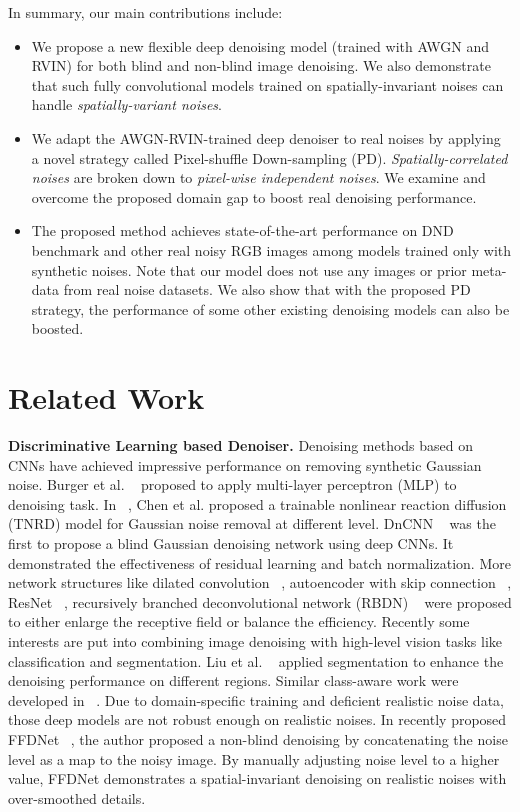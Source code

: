 \documentclass[letterpaper]{article} \usepackage{aaai20}  \usepackage{times}  \usepackage{helvet} \usepackage{courier}  \usepackage{comment}
\begin{document}
In summary, our main contributions include:
\begin{itemize}

\item
We propose a new flexible deep denoising model (trained with AWGN and RVIN) for both blind and non-blind image denoising. We also demonstrate that such fully convolutional models trained on spatially-invariant noises can handle {\em spatially-variant noises}. 
\item
We adapt the AWGN-RVIN-trained deep denoiser to real noises by applying a novel strategy called Pixel-shuffle Down-sampling (PD). {\em Spatially-correlated noises} are broken down to {\em pixel-wise independent noises}. We examine and overcome the proposed domain gap to boost real denoising performance.
\item
The proposed method achieves state-of-the-art performance on DND benchmark and other real noisy RGB images among models trained only with synthetic noises. Note that our model does not use any images or prior meta-data from real noise datasets. We also show that with the proposed PD strategy, the performance of some other existing denoising models can also be boosted. 
\end{itemize}
 \section{Related Work}
\textbf{Discriminative Learning based Denoiser.}
Denoising methods based on CNNs have achieved impressive performance on removing synthetic Gaussian noise.  Burger et al. ~\cite{burger2012image} proposed to apply multi-layer perceptron (MLP) to denoising task. In ~\cite{chen2017trainable}, Chen et al. proposed  a trainable nonlinear reaction diffusion (TNRD) model for Gaussian noise removal at different level. DnCNN ~\cite{zhang2017beyond} was the first to propose a blind Gaussian denoising network using deep CNNs. It demonstrated the effectiveness of residual learning and batch normalization. More network structures like dilated convolution ~\cite{zhang2017learning}, autoencoder with skip connection ~\cite{mao2016image}, ResNet ~\cite{ren2018dn}, recursively branched deconvolutional network (RBDN) ~\cite{santhanam2017generalized} were proposed to either enlarge the receptive field or balance the efficiency. Recently some interests are put into combining image denoising with high-level vision tasks like classification and segmentation. Liu et al. ~\cite{liu2017image} applied segmentation to enhance the denoising performance on different regions. Similar class-aware work were developed in ~\cite{niknejad2017class}. Due to domain-specific training and deficient realistic noise data, those deep models are not robust enough on realistic noises. In recently proposed FFDNet ~\cite{zhang2018ffdnet}, the author proposed a non-blind denoising by concatenating the noise level as a map to the noisy image. By manually adjusting noise level to a higher value, FFDNet demonstrates a spatial-invariant denoising on realistic noises with over-smoothed details.
\end{document}
